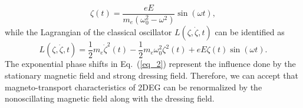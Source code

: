 \begin{equation} \label{eq_4}
  \zeta(t) = \frac{eE}{m_e(\omega_0^2 - \omega^2)}\sin(\omega t),
\end{equation}
while the Lagrangian of the classical oscillator $L(\zeta,\dot{\zeta},t)$ can be identified as
\begin{equation} \label{eq_5}
  L(\zeta,\dot{\zeta},t) = \frac{1}{2} m_e\dot{\zeta}^2(t) - \frac{1}{2}m_e\omega_0^2 \zeta^2(t) + eE\zeta(t) \sin(\omega t).
\end{equation}
The exponential phase shifts in Eq.~(\ref{eq_2}) represent the influence done by the stationary magnetic field and strong dressing field. Therefore, we can accept that magneto-transport characteristics of 2DEG can be renormalized by the nonoscillating magnetic field along with the dressing field.
